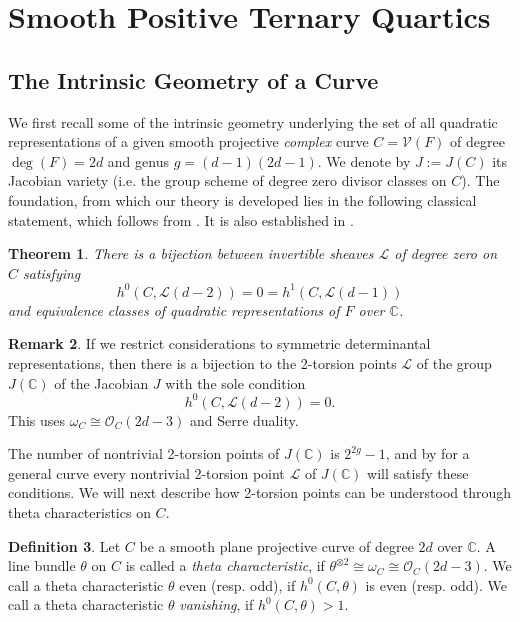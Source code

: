 \documentclass[a4paper,10pt]{amsart}
\theoremstyle{definition}
\newtheorem{Def}{Definition}[section]
\newtheorem{rem}[Def]{Remark}
\theoremstyle{plain}
\newtheorem{thm}[Def]{Theorem}
\newcommand{\cL}{{\mathcal L}}
\newcommand{\cO}{{\mathcal O}}
\newcommand{\cV}{{\mathcal V}}
\newcommand{\C}{{\mathbb C}}
\begin{document}
\section{Smooth Positive Ternary Quartics}

\subsection{The Intrinsic Geometry of a Curve}

We first recall some of the intrinsic geometry underlying the set of all quadratic representations of a given smooth projective \emph{complex} curve $C = \cV(F)$ of degree $\deg(F) = 2d$ and genus $g = (d-1)(2d-1)$. We denote by $J := J(C)$ its Jacobian variety (i.e. the group scheme of degree zero divisor classes on $C$). The foundation, from which our theory is developed lies in the following classical statement, which follows from \cite[Theorem B]{beauville}. It is also established in \cite[\S6.2.2]{dolgachev}.

\begin{thm} \label{thm:2tor=QDR}
    There is a bijection between invertible sheaves $\cL$ of degree zero on $C$ satisfying
    \begin{equation*}
        h^0(C, \cL(d-2)) = 0 = h^1(C, \cL(d-1))
    \end{equation*}
    and equivalence classes of quadratic representations of $F$ over $\C$.
\end{thm}

\begin{rem}
    If we restrict considerations to symmetric determinantal representations, then there is a bijection to the 2-torsion points $\cL$ of the group $J(\C)$ of the Jacobian $J$ with the sole condition
    \begin{equation*}
        h^0(C, \cL(d-2)) = 0.
    \end{equation*}
    This uses $\omega_C \cong \cO_C(2d-3)$ and Serre duality.
\end{rem}

The number of nontrivial 2-torsion points of $J(\C)$ is $2^{2g}-1$, and by \cite[Proposition 4.6]{beauville} for a general curve every nontrivial 2-torsion point $\cL$ of $J(\C)$ will satisfy these conditions. We will next describe how 2-torsion points can be understood through theta characteristics on $C$.

\begin{Def}
    Let $C$ be a smooth plane projective curve of degree $2d$ over $\C$. A line bundle $\theta$ on $C$ is called a \emph{theta characteristic}, if $\theta^{\otimes2} \cong \omega_C \cong \cO_C(2d-3)$. We call a theta characteristic $\theta$ even (resp. odd), if $h^0(C, \theta)$ is even (resp. odd). We call a theta characteristic $\theta$ \emph{vanishing}, if $h^0(C, \theta) > 1$.
\end{Def}
\end{document}
